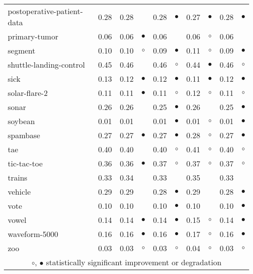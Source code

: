 {\begin{longtable}{lrr@{\hspace{0.1cm}}cr@{\hspace{0.1cm}}cr@{\hspace{0.1cm}}cr@{\hspace{0.1cm}}c}
postoperative-patient-data & 0.28 & 0.28 &           & 0.28 &  $\bullet$ & 0.27 & $\bullet$ & 0.28 &  $\bullet$\\
primary-tumor & 0.06 & 0.06 & $\bullet$ & 0.06 &            & 0.06 &   $\circ$ & 0.06 &           \\
segment & 0.10 & 0.10 &   $\circ$ & 0.09 &  $\bullet$ & 0.11 &   $\circ$ & 0.09 &  $\bullet$\\
shuttle-landing-control & 0.45 & 0.46 &           & 0.46 &    $\circ$ & 0.44 & $\bullet$ & 0.46 &    $\circ$\\
sick & 0.13 & 0.12 & $\bullet$ & 0.12 &  $\bullet$ & 0.11 & $\bullet$ & 0.12 &  $\bullet$\\
solar-flare-2 & 0.11 & 0.11 & $\bullet$ & 0.11 &    $\circ$ & 0.12 &   $\circ$ & 0.11 &    $\circ$\\
sonar & 0.26 & 0.26 &           & 0.25 &  $\bullet$ & 0.26 &           & 0.25 &  $\bullet$\\
soybean & 0.01 & 0.01 &           & 0.01 &  $\bullet$ & 0.01 &   $\circ$ & 0.01 &  $\bullet$\\
spambase & 0.27 & 0.27 & $\bullet$ & 0.27 &  $\bullet$ & 0.28 &   $\circ$ & 0.27 &  $\bullet$\\
tae & 0.40 & 0.40 &           & 0.40 &    $\circ$ & 0.41 &   $\circ$ & 0.40 &    $\circ$\\
tic-tac-toe & 0.36 & 0.36 & $\bullet$ & 0.37 &    $\circ$ & 0.37 &   $\circ$ & 0.37 &    $\circ$\\
trains & 0.33 & 0.34 &           & 0.33 &            & 0.35 &           & 0.33 &           \\
vehicle & 0.29 & 0.29 &           & 0.28 &  $\bullet$ & 0.29 &           & 0.28 &  $\bullet$\\
vote & 0.10 & 0.10 &           & 0.10 &  $\bullet$ & 0.10 &           & 0.10 &  $\bullet$\\
vowel & 0.14 & 0.14 & $\bullet$ & 0.14 &  $\bullet$ & 0.15 &   $\circ$ & 0.14 &  $\bullet$\\
waveform-5000 & 0.16 & 0.16 & $\bullet$ & 0.16 &  $\bullet$ & 0.17 &   $\circ$ & 0.16 &  $\bullet$\\
zoo & 0.03 & 0.03 &   $\circ$ & 0.03 &    $\circ$ & 0.04 &   $\circ$ & 0.03 &    $\circ$\\
\hline
\multicolumn{10}{c}{$\circ$, $\bullet$ statistically significant improvement or degradation}\\
\end{longtable} \footnotesize \par}